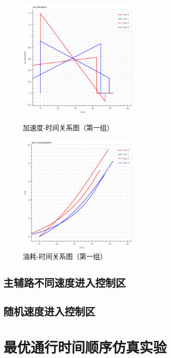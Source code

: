 \begin{figure}[htbp]
\begin{minipage}{0.48\textwidth}
  \centering
  \includegraphics[height=6cm]{figures/sim_case1/acc.png}
  \caption{加速度-时间关系图（第一组）}
  \label{fig:case1:acc}
\end{minipage}\hfill
\begin{minipage}{0.48\textwidth}
  \centering
  \includegraphics[height=6cm]{figures/sim_case1/fuel.png}
  \caption{油耗-时间关系图（第一组）}
  \label{fig:case1:fuel}
\end{minipage}
\end{figure}

\subsection{主辅路不同速度进入控制区}
\subsection{随机速度进入控制区}

\section{最优通行时间顺序仿真实验}


